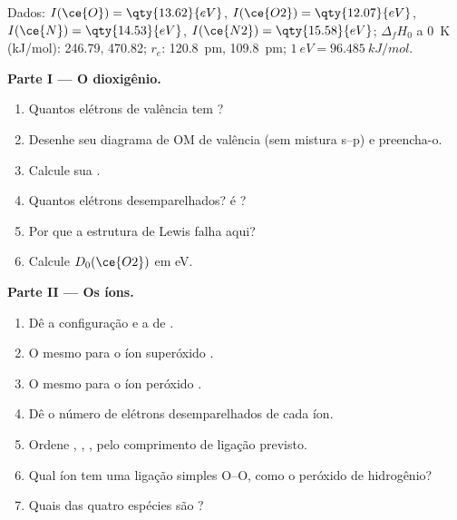 \begin{problem}
\label{pb:b2:diatomic-mos:1}
Dados: $I(\ce{O}) = \qty{13.62}{eV}$, $I(\ce{O2}) = \qty{12.07}{eV}$, $I(\ce{N}) =
\qty{14.53}{eV}$, $I(\ce{N2}) = \qty{15.58}{eV}$; $\Delta_f H_0$ a \qty{0}{K}
(\unit{kJ/mol}):  246.79,  470.82; $r_e$:  \qty{120.8}{pm}, 
\qty{109.8}{pm}; $1\ \unit{eV} = \qty{96.485}{kJ/mol}$.

\medskip
\noindent\textbf{Parte I --- O dioxigênio.}
\begin{enumerate}
  \item Quantos elétrons de valência tem ?
  \item Desenhe seu diagrama de OM de valência (sem mistura s--p) e preencha-o.
  \item Calcule sua .
  \item Quantos elétrons desemparelhados?  é ?
  \item Por que a estrutura de Lewis falha aqui?
  \item Calcule $D_0(\ce{O2})$ em \unit{eV}.
\end{enumerate}

\medskip
\noindent\textbf{Parte II --- Os íons.}
\begin{enumerate}[resume]
  \item Dê a configuração e a  de .
  \item O mesmo para o íon superóxido .
  \item O mesmo para o íon peróxido .
  \item Dê o número de elétrons desemparelhados de cada íon.
  \item Ordene , , ,  pelo comprimento de ligação previsto.
  \item Qual íon tem uma ligação simples O--O, como o peróxido de hidrogênio?
  \item Quais das quatro espécies são ?
\end{enumerate}


\end{problem}
